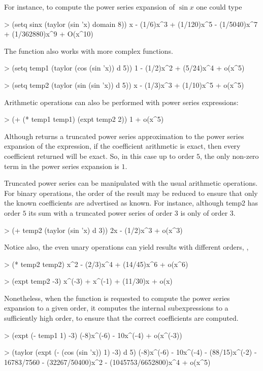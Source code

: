 For instance, to compute the power series expansion of $\sin x$ one
could type
\begin{code}  
> (setq sinx (taylor (sin 'x) domain 8))
x - (1/6)x^3 + (1/120)x^5 - (1/5040)x^7 + (1/362880)x^9 + O(x^10)
\end{code}

The  function also works with more complex functions.
\begin{code}  
> (setq temp1 (taylor (cos (sin 'x)) d 5))
1 - (1/2)x^2 + (5/24)x^4 + o(x^5)
  
> (setq temp2 (taylor (sin (sin 'x)) d 5))
x - (1/3)x^3 + (1/10)x^5 + o(x^5)
\end{code}
  
Arithmetic operations can also be performed with power series
expressions:
\begin{code}
> (+ (* temp1 temp1) (expt temp2 2))
1 + o(x^5)
\end{code}
  
Although  returns a truncated power series
approximation to the power series expansion of the expression, if the
coefficient arithmetic is exact, then every coefficient returned will
be exact. So, in this case up to order $5$, the only non-zero term in
the power series expansion is $1$.
  
Truncated power series can be manipulated with the usual arithmetic
operations. For binary operations, the order of the result may be
reduced to ensure that only the known coefficients are advertised as
known.  For instance, although {\sf temp2} has order $5$ its sum with a
truncated power series of order $3$ is only of order $3$.
\begin{code}  
> (+ temp2 (taylor (sin 'x) d 3))  
2x - (1/2)x^3 + o(x^3)
\end{code}
  
\noindent
Notice also, the even unary operations can yield results with
different orders, \viz,
\begin{code}
> (* temp2 temp2)  
x^2 - (2/3)x^4 + (14/45)x^6 + o(x^6)
  
> (expt temp2 -3)
x^(-3) + x^(-1) + (11/30)x + o(x)
\end{code}
  
\noindent
Nonetheless, when the  function is requested to
compute the power series expansion to a given order, it computes the
internal subexpressions to a sufficiently high order, to ensure that
the correct coefficients are computed.
\begin{code}  
> (expt (- temp1 1) -3)
(-8)x^(-6) - 10x^(-4) + o(x^(-3))
  
> (taylor (expt (- (cos (sin 'x)) 1) -3) d 5)
(-8)x^(-6) - 10x^(-4) - (88/15)x^(-2) - 16783/7560 - (32267/50400)x^2
 - (1045753/6652800)x^4 + o(x^5)
\end{code}
  
